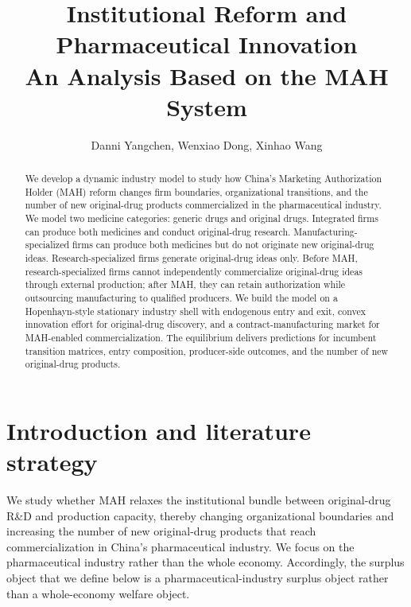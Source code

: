 \documentclass[12pt]{article}
\title{Institutional Reform and Pharmaceutical Innovation
\\An Analysis Based on the MAH System}
\author{Danni Yangchen, Wenxiao Dong, Xinhao Wang}
\date{}
\newcommand{\1}{\mathbf{1}}
\begin{document}
\maketitle

\begin{abstract}
We develop a dynamic industry model to study how China's Marketing Authorization Holder (MAH) reform changes firm boundaries, organizational transitions, and the number of new original-drug products commercialized in the pharmaceutical industry. We model two medicine categories: generic drugs and original drugs. Integrated firms can produce both medicines and conduct original-drug research. Manufacturing-specialized firms can produce both medicines but do not originate new original-drug ideas. Research-specialized firms generate original-drug ideas only. Before MAH, research-specialized firms cannot independently commercialize original-drug ideas through external production; after MAH, they can retain authorization while outsourcing manufacturing to qualified producers. We build the model on a Hopenhayn-style stationary industry shell with endogenous entry and exit, convex innovation effort for original-drug discovery, and a contract-manufacturing market for MAH-enabled commercialization. The equilibrium delivers predictions for incumbent transition matrices, entry composition, producer-side outcomes, and the number of new original-drug products.
\end{abstract}

\section{Introduction and literature strategy}

We study whether MAH relaxes the institutional bundle between original-drug R\&D and production capacity, thereby changing organizational boundaries and increasing the number of new original-drug products that reach commercialization in China's pharmaceutical industry. We focus on the pharmaceutical industry rather than the whole economy. Accordingly, the surplus object that we define below is a pharmaceutical-industry surplus object rather than a whole-economy welfare object.
\end{document}
